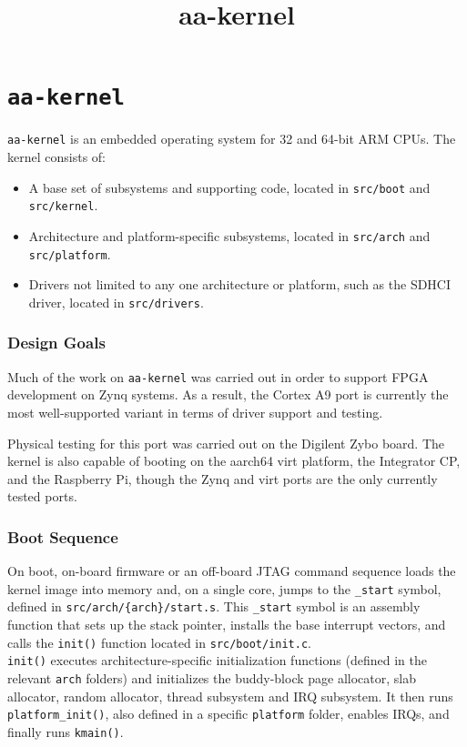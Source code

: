 \documentclass[a4paper,12pt]{refrep}
\title{aa-kernel}
\newcommand{\code}[1]{\colorbox{light-gray}{\texttt{#1}}}
\begin{document}
\chapter{\texttt{aa-kernel}}
\code{aa-kernel} is an embedded operating system for 32 and 64-bit 
ARM CPUs. The kernel consists of:
\begin{itemize}
\item A base set of subsystems and supporting code, 
    located in \code{src/boot} and \code{src/kernel}.
\item Architecture and platform-specific subsystems, 
    located in \code{src/arch} and \code{src/platform}.
\item Drivers not limited to any one architecture or platform, 
    such as the SDHCI driver, located in \code{src/drivers}.
\end{itemize}

\subsection{Design Goals}
Much of the work on \code{aa-kernel} was carried out in order 
to support FPGA development 
on Zynq systems. As a result, the Cortex A9 port is 
currently the most well-supported variant in terms of 
driver support and testing. 

Physical testing for this port was carried out on the 
Digilent Zybo board. The kernel is also capable of booting 
on the aarch64 virt platform, the Integrator CP, and the 
Raspberry Pi, though the Zynq and virt ports are the only 
currently tested ports.

\subsection{Boot Sequence}
On boot, on-board firmware or an off-board JTAG command sequence 
loads the kernel image into memory and, on a single core, 
jumps to the \code{\_start} symbol, defined in 
\code{src/arch/\{arch\}/start.s}. This \code{\_start} symbol 
is an assembly function that sets up the stack pointer, 
installs the base interrupt vectors, and calls the \code{init()} 
function located in \code{src/boot/init.c}.
\\
\code{init()} executes architecture-specific 
initialization functions (defined in the relevant \code{arch} 
folders) 
and initializes the buddy-block page allocator, slab allocator, 
random allocator, thread subsystem and IRQ subsystem. It then runs
\code{platform\_init()}, also defined in a specific \code{platform} 
folder, enables IRQs, and finally runs \code{kmain()}.
\end{document}
